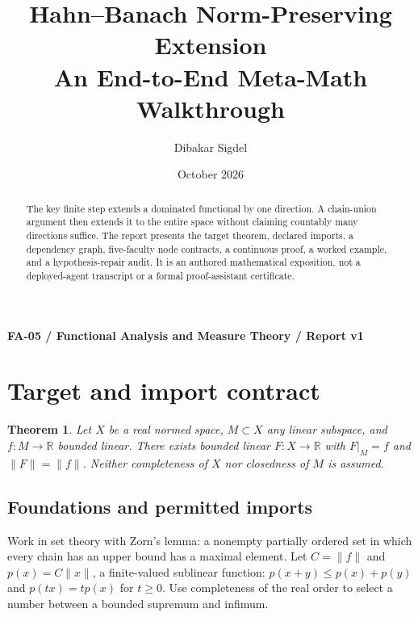 \documentclass[preprint,12pt,aps,pra,showkeys,amsmath,amssymb,superscriptaddress,floatfix]{revtex4-2}
\newtheorem{theorem}{Theorem}[section]
\theoremstyle{definition}
\theoremstyle{remark}
\begin{document}
\title{Hahn--Banach Norm-Preserving Extension\\[4pt]\large An End-to-End Meta-Math Walkthrough}

\author{Dibakar Sigdel}


\date{October 2026}

\begin{abstract}

The key finite step extends a dominated functional by one direction. A
chain-union argument then extends it to the entire space without
claiming countably many directions suffice. The report presents the
target theorem, declared imports, a dependency graph, five-faculty node
contracts, a continuous proof, a worked example, and a hypothesis-repair
audit. It is an authored mathematical exposition, not a deployed-agent
transcript or a formal proof-assistant certificate.

\end{abstract}\maketitle\linespread{1.12}\selectfont

\noindent\textbf{FA-05 / Functional Analysis and Measure Theory / Report v1}

\section{Target and import contract}

\begin{theorem}

Let \(X\) be a real normed space, \(M\subset X\) any linear subspace,
and \(f:M\to\mathbb R\) bounded linear. There exists bounded linear
\(F:X\to\mathbb R\) with \(F|_M=f\) and \(\|F\|=\|f\|\). Neither
completeness of \(X\) nor closedness of \(M\) is assumed.

\end{theorem}

\subsection{Foundations and permitted imports}

Work in set theory with Zorn's lemma: a nonempty partially ordered set
in which every chain has an upper bound has a maximal element. Let
\(C=\|f\|\) and \(p(x)=C\|x\|\), a finite-valued sublinear function:
\(p(x+y)\le p(x)+p(y)\) and \(p(tx)=tp(x)\) for \(t\ge0\). Use
completeness of the real order to select a number between a bounded
supremum and infimum.
\end{document}
